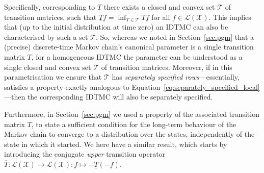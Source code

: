 \documentclass[graybox]{svmult}
\newcommand{\states}{\mathcal{X}}
\newcommand{\gambles}{\mathcal{L}}
\newcommand{\gamblesX}{\gambles(\states)}
\begin{document}
Specifically, corresponding to $\underline{T}$ there exists a closed and convex set $\mathcal{T}$ of transition matrices, such that $\underline{T}f=\inf_{T\in\mathcal{T}}Tf$ for all $f\in\gamblesX$. This implies that (up to the initial distribution at time zero) an IDTMC can also be characterised by such a set $\mathcal{T}$. So, whereas we noted in Section~\ref{sec:pgm} that a (precise) discrete-time Markov chain's canonical parameter is a single transition matrix $T$, for a homogeneous IDTMC the parameter can be understood as a single closed and convex set $\mathcal{T}$ of transition matrices. Moreover, if in this parametrisation we ensure that $\mathcal{T}$ has \emph{separately specified rows}---essentially, satisfies a property exactly analogous to Equation~\eqref{eq:separately_specified_local}---then the corresponding IDTMC will also be separately specified.

Furthermore, in Section~\ref{sec:pgm} we used a property of the associated transition matrix $T$, to state a sufficient condition for the long-term behaviour of the Markov chain to converge to a distribution over the states, independently of the state in which it started. We here have a similar result, which starts by introducing the conjugate \emph{upper} transition operator $\overline{T}:\gamblesX\to\gamblesX:f\mapsto -\underline{T}(-f)$.
\end{document}
